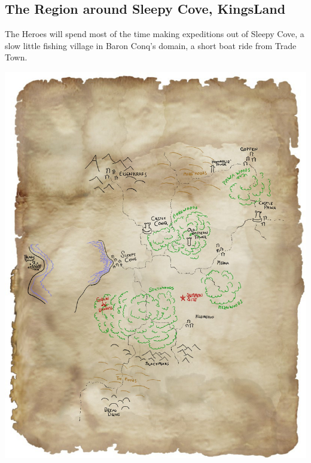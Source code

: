 \goodbreak
\begin{samepage}

\subsection*{The Region around Sleepy Cove, KingsLand}
The Heroes will spend most of the time making expeditions out of Sleepy Cove, a slow little fishing village in Baron Conq's domain, a short boat ride from Trade Town.

\begin{center}
\vspace{1 cm}
\includegraphics[width=1.0\linewidth]{./maps/region-gm.jpg}
\end{center}

\end{samepage}








